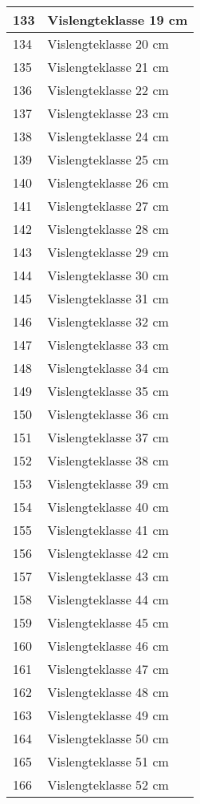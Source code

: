 \documentclass[
]{book}
\begin{document}
\begin{table}
\begin{tabular}[t]{l|l}
\hline
133 & Vislengteklasse 19 cm\\
\hline
134 & Vislengteklasse 20 cm\\
\hline
135 & Vislengteklasse 21 cm\\
\hline
136 & Vislengteklasse 22 cm\\
\hline
137 & Vislengteklasse 23 cm\\
\hline
138 & Vislengteklasse 24 cm\\
\hline
139 & Vislengteklasse 25 cm\\
\hline
140 & Vislengteklasse 26 cm\\
\hline
141 & Vislengteklasse 27 cm\\
\hline
142 & Vislengteklasse 28 cm\\
\hline
143 & Vislengteklasse 29 cm\\
\hline
144 & Vislengteklasse 30 cm\\
\hline
145 & Vislengteklasse 31 cm\\
\hline
146 & Vislengteklasse 32 cm\\
\hline
147 & Vislengteklasse 33 cm\\
\hline
148 & Vislengteklasse 34 cm\\
\hline
149 & Vislengteklasse 35 cm\\
\hline
150 & Vislengteklasse 36 cm\\
\hline
151 & Vislengteklasse 37 cm\\
\hline
152 & Vislengteklasse 38 cm\\
\hline
153 & Vislengteklasse 39 cm\\
\hline
154 & Vislengteklasse 40 cm\\
\hline
155 & Vislengteklasse 41 cm\\
\hline
156 & Vislengteklasse 42 cm\\
\hline
157 & Vislengteklasse 43 cm\\
\hline
158 & Vislengteklasse 44 cm\\
\hline
159 & Vislengteklasse 45 cm\\
\hline
160 & Vislengteklasse 46 cm\\
\hline
161 & Vislengteklasse 47 cm\\
\hline
162 & Vislengteklasse 48 cm\\
\hline
163 & Vislengteklasse 49 cm\\
\hline
164 & Vislengteklasse 50 cm\\
\hline
165 & Vislengteklasse 51 cm\\
\hline
166 & Vislengteklasse 52 cm\\

\end{tabular}
\end{table}
\end{document}
